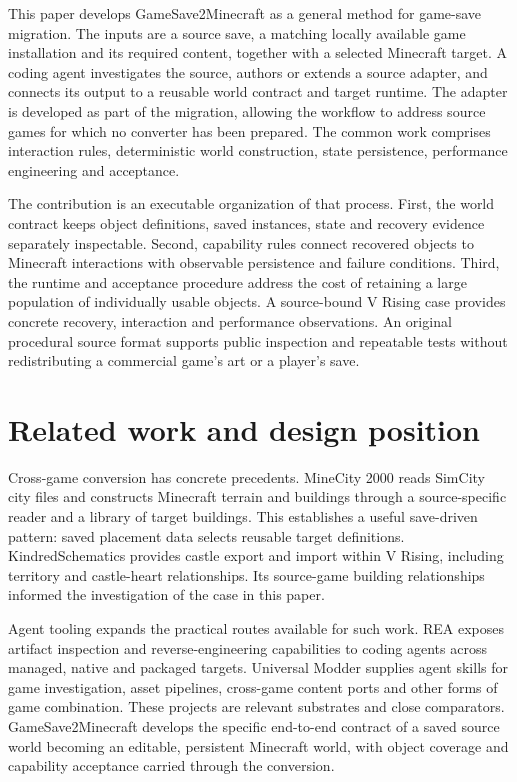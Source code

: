\documentclass[11pt]{article}
\begin{document}
This paper develops GameSave2Minecraft as a general method for game-save migration.
The inputs are a source save, a matching locally available game installation and
its required content, together with a selected Minecraft target. A coding agent
investigates the source, authors or extends a source adapter, and connects its
output to a reusable world contract and target runtime. The adapter is developed
as part of the migration, allowing the workflow to address source games for
which no converter has been prepared. The common work comprises interaction
rules, deterministic world construction, state persistence, performance
engineering and acceptance.

The contribution is an executable organization of that process. First, the world
contract keeps object definitions, saved instances, state and recovery evidence
separately inspectable. Second, capability rules connect recovered objects to
Minecraft interactions with observable persistence and failure conditions.
Third, the runtime and acceptance procedure address the cost of retaining a
large population of individually usable objects. A source-bound V Rising case
provides concrete recovery, interaction and performance observations. An original
procedural source format supports public inspection and repeatable tests without
redistributing a commercial game's art or a player's save.

\section{Related work and design position}

Cross-game conversion has concrete precedents. MineCity 2000 reads SimCity city
files and constructs Minecraft terrain and buildings through a source-specific
reader and a library of target buildings.\cite{minecity} This establishes a useful
save-driven pattern: saved placement data selects reusable target definitions.
KindredSchematics provides castle export and import within V Rising, including
territory and castle-heart relationships.\cite{kindred} Its source-game building
relationships informed the investigation of the case in this paper.

Agent tooling expands the practical routes available for such work. REA exposes
artifact inspection and reverse-engineering capabilities to coding agents across
managed, native and packaged targets.\cite{rea} Universal Modder supplies agent
skills for game investigation, asset pipelines, cross-game content ports and
other forms of game combination.\cite{universal} These projects are relevant
substrates and close comparators. GameSave2Minecraft develops the specific
end-to-end contract of a saved source world becoming an editable, persistent
Minecraft world, with object coverage and capability acceptance carried through
the conversion.
\end{document}
